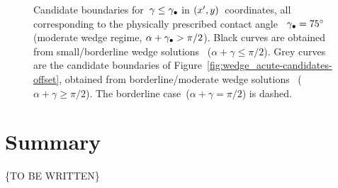\begin{figure}
  \newcommand*{\subfigurewidth}{0.31\textwidth}
  \begin{subfigure}[t]{\subfigurewidth}
  \end{subfigure}
  \hfill
  \begin{subfigure}[t]{\subfigurewidth}
  \end{subfigure}
  \hfill
  \begin{subfigure}[t]{\subfigurewidth}
  \end{subfigure}
  \caption{
    Candidate boundaries for~$\gamma \le \gamma_\bullet$
    in $(x', y)$~coordinates,
    all corresponding to the physically prescribed contact angle~%
    $\gamma_\bullet = \SI{75}{\degree}$
    (moderate wedge regime, $\alpha + \gamma_\bullet > \pi/2$).
    Black curves are obtained from small/borderline wedge solutions~%
      ($\alpha + \gamma \le \pi/2$).
    Grey curves are the candidate boundaries of
    Figure~\ref{fig:wedge_acute-candidates-offset},
    obtained from borderline/moderate wedge solutions~%
      ($\alpha + \gamma \ge \pi/2$).
    The borderline case~($\alpha + \gamma = \pi/2$) is dashed.
  }
  \label{fig:wedge_small-moderate-candidates-offset}
\end{figure}

\section{Summary}
\label{sec:small.summary}

\{TO BE WRITTEN\}
